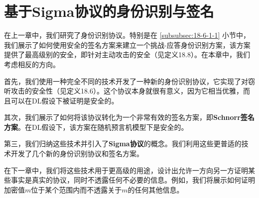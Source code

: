 \chapter{基于Sigma协议的身份识别与签名}

在上一章中，我们研究了身份识别协议。特别是在 \ref{subsubsec:18-6-1-1} 小节中，我们展示了如何使用安全的签名方案来建立一个挑战-应答身份识别方案，该方案提供了最高级别的安全，即针对主动攻击的安全（见定义18.8）。在本章中，我们考虑相反的方向。

首先，我们使用一种完全不同的技术开发了一种新的身份识别协议，它实现了对窃听攻击的安全性（见定义18.6）。这个协议本身就很有意义，因为它相当优雅，而且可以在DL假设下被证明是安全的。

其次，我们展示了如何将该协议转化为一个非常有效的签名方案，即\textbf{Schnorr签名方案}。在DL假设下，该方案在随机预言机模型下是安全的。

第三，我们归纳这些技术并引入了\textbf{Sigma协议}的概念。我们利用这些更普适的技术开发了几个新的身份识别协议和签名方案。

在下一章中，我们将这些技术用于更高级的用途，设计出允许一方向另一方证明某些事实是真实的协议，同时不透露任何不必要的信息。例如，我们将展示如何证明加密值$m$位于某个范围内而不透露关于$m$的任何其他信息。












